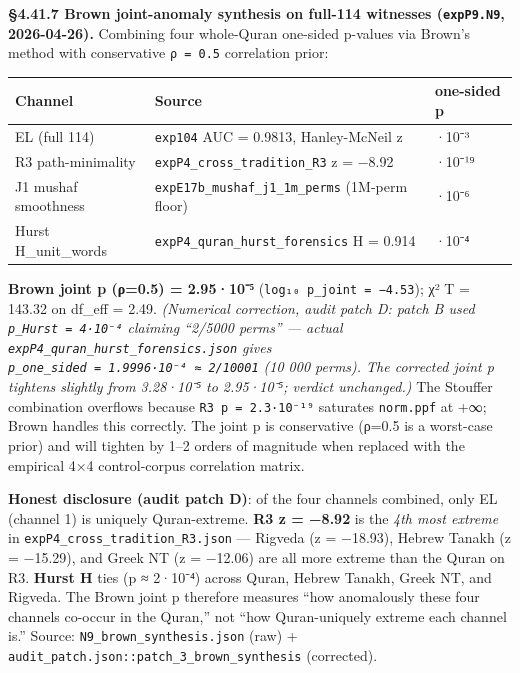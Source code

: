 \documentclass[
]{article}
\newcounter{none} %
\begin{document}
\textbf{§4.41.7 Brown joint-anomaly synthesis on full-114 witnesses
(\texttt{expP9.N9}, 2026-04-26).} Combining four whole-Quran one-sided
p-values via Brown's method with conservative \texttt{ρ\ =\ 0.5}
correlation prior:

{\def\LTcaptype{none} %
\begin{longtable}[]{@{}
  >{\raggedright\arraybackslash}p{}
  >{\raggedright\arraybackslash}p{}
  >{\raggedleft\arraybackslash}p{}@{}}
\toprule\noalign{}
\begin{minipage}[b]{\linewidth}\raggedright
Channel
\end{minipage} & \begin{minipage}[b]{\linewidth}\raggedright
Source
\end{minipage} & \begin{minipage}[b]{\linewidth}\raggedleft
one-sided p
\end{minipage} \\
\midrule\noalign{}
\endhead
\bottomrule\noalign{}
\endlastfoot
EL (full 114) & \texttt{exp104} AUC = 0.9813, Hanley-McNeil z &
1.6·10⁻³ \\
R3 path-minimality & \texttt{expP4\_cross\_tradition\_R3} z = −8.92 &
2.3·10⁻¹⁹ \\
J1 mushaf smoothness & \texttt{expE17b\_mushaf\_j1\_1m\_perms} (1M-perm
floor) & 1·10⁻⁶ \\
Hurst H\_unit\_words & \texttt{expP4\_quran\_hurst\_forensics} H = 0.914
& 4·10⁻⁴ \\
\end{longtable}
}

\textbf{Brown joint p (ρ=0.5) = 2.95·10⁻⁵}
(\texttt{log₁₀\ p\_joint\ =\ −4.53}); χ² T = 143.32 on df\_eff = 2.49.
\emph{(Numerical correction, audit patch D: patch B used
\texttt{p\_Hurst\ =\ 4·10⁻⁴} claiming ``2/5000 perms'' --- actual
\texttt{expP4\_quran\_hurst\_forensics.json} gives
\texttt{p\_one\_sided\ =\ 1.9996·10⁻⁴\ ≈\ 2/10001} (10 000 perms). The
corrected joint p tightens slightly from 3.28·10⁻⁵ to 2.95·10⁻⁵; verdict
unchanged.)} The Stouffer combination overflows because
\texttt{R3\ p\ =\ 2.3·10⁻¹⁹} saturates \texttt{norm.ppf} at +∞; Brown
handles this correctly. The joint p is conservative (ρ=0.5 is a
worst-case prior) and will tighten by 1--2 orders of magnitude when
replaced with the empirical 4×4 control-corpus correlation matrix.

\textbf{Honest disclosure (audit patch D)}: of the four channels
combined, only EL (channel 1) is uniquely Quran-extreme. \textbf{R3 z =
−8.92} is the \emph{4th most extreme} in
\texttt{expP4\_cross\_tradition\_R3.json} --- Rigveda (z = −18.93),
Hebrew Tanakh (z = −15.29), and Greek NT (z = −12.06) are all more
extreme than the Quran on R3. \textbf{Hurst H} ties (p ≈ 2·10⁻⁴) across
Quran, Hebrew Tanakh, Greek NT, and Rigveda. The Brown joint p therefore
measures ``how anomalously these four channels co-occur in the Quran,''
not ``how Quran-uniquely extreme each channel is.'' Source:
\texttt{N9\_brown\_synthesis.json} (raw) +
\texttt{audit\_patch.json::patch\_3\_brown\_synthesis} (corrected).
\end{document}
